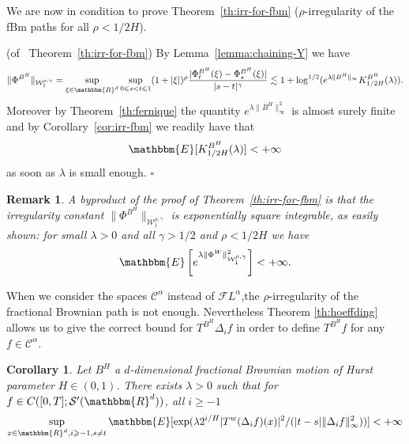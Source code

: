 \documentclass[a4paper,11pt]{article}
\newtheorem{corollary}[theorem]{Corollary}
\newtheorem{remark}[theorem]{Remark}
\newenvironment{proof}{{\sc Proof.}}{\hfill$\square$}
\newcommand{\CC}{\mathscr C}
\newcommand{\CF}{\mathscr F}
\begin{document}
We are now in condition to prove Theorem~\ref{th:irr-for-fbm}
($\rho$-irregularity of the fBm paths for all $\rho <1/2H$).

\begin{proof}
  (of \ Theorem~\ref{th:irr-for-fbm}) By Lemma~\ref{lemma:chaining-Y} we have
  \[ \| \Phi^{B^{H}} \|_{\mathcal{W}^{\rho , \gamma}_{1}} = \sup_{\xi \in
     \mathbbm{R}^{d}}   \sup_{0 \leqslant s<t \leqslant 1} ( 1+ | \xi |
     )^{\rho} \frac{| \Phi^{B^{H}}_{t} ( \xi )- \Phi^{B^{H}}_{s} ( \xi
     )|}{|s-t|^{\gamma}} \lesssim 1+ \log^{1/2} ( e^{\lambda \| B^{H}
     \|_{\infty}} K^{B^{H}}_{1/2H} ( \lambda ) ) . \]
  Moreover by Theorem~\ref{th:fernique} the quantity $e^{\lambda \| B^{H}
  \|_{\infty}^{2}}$ is almost surely finite and by Corollary~\ref{cor:irr-fbm}
  we readily have that
  \[ \mathbbm{E} [K^{B^{H}}_{1/2H} ( \lambda ) ] <+ \infty \]
  as soon as $\lambda$ is small enough.
\end{proof}

\begin{remark}
  A byproduct of the proof of Theorem~\ref{th:irr-for-fbm} is that the
  irregularity constant $\| \Phi^{B^{H}} \|_{\mathcal{W}^{\rho , \gamma}_{1}}$
  is exponentially square integrable, as easily shown: for small $\lambda >0$
  and all $\gamma >1/2$ and $\rho <1/2H$ we have
  \[ \mathbbm{E} \left[ e^{\lambda \| \Phi^{W} \|^{2}_{\mathcal{W}^{\rho ,
     \gamma}_{1}}} \right] <+ \infty . \]
\end{remark}

When we consider the spaces $\CC^{\alpha}$ instead of $\CF L^{\alpha}$,the
$\rho$-irregularity of the fractional Brownian path is not enough.
Nevertheless Theorem \ref{th:hoeffding} allows us to give the correct bound
for $T^{B^{H}} \Delta_{i} f$ in order to define $T^{B^{H}} f$ for any $f \in
\CC^{\alpha}$.

\begin{corollary}
  Let $B^{H}$ a $d$-dimensional fractional Brownian motion of Hurst parameter
  $H \in ( 0,1 )$. There exists $\lambda >0$ such that for $f \in C ( [ 0,T ]
  ;\mathcal{S}' ( \mathbbm{R}^{d} ) )$, all $i \geqslant -1$
  \[ \sup_{x \in \mathbbm{R}^{d} ,i \geqslant -1,s \neq t} \mathbbm{E} [ \exp
     ( \lambda 2^{i/H} | T^{w} ( \Delta_{i} f ) ( x ) |^{2} / ( | t-s | \|
     \Delta_{i} f \|_{\infty}^{2} ) ) ] <+ \infty \]
\end{corollary}
\end{document}
